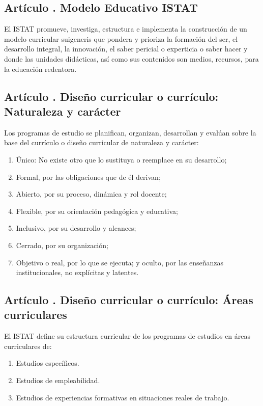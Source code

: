 \subsection{Artículo . Modelo Educativo ISTAT}
\addtocounter{ns}{1}
El ISTAT promueve, investiga, estructura e implementa la construcción de un modelo curricular suigeneris que pondera y prioriza la formación del ser, el desarrollo integral, la innovación, el saber pericial o experticia o saber hacer y donde las unidades didácticas, así como sus contenidos son medios, recursos, para la educación redentora. 
\subsection{Artículo . Diseño curricular o currículo: Naturaleza y carácter}
\addtocounter{ns}{1}
Los programas de estudio se planifican, organizan, desarrollan y evalúan sobre la base del currículo o diseño curricular de naturaleza y carácter:  
\begin{enumerate}
\item Único: No existe otro que lo sustituya o reemplace en su desarrollo;  
\item Formal, por las obligaciones que de él derivan; 
\item Abierto, por su proceso, dinámica y rol docente; 
\item Flexible, por su orientación pedagógica y educativa;  
\item Inclusivo, por su desarrollo y alcances;  
\item Cerrado, por su organización;  
\item Objetivo o real, por lo que se ejecuta; y oculto, por las enseñanzas institucionales, no explícitas y latentes. 
\end{enumerate}
\subsection{Artículo . Diseño curricular o currículo: Áreas curriculares}
\addtocounter{ns}{1}
El ISTAT define su estructura curricular de los programas de estudios en áreas curriculares de: 
\begin{enumerate}
\item Estudios específicos.
\item Estudios de empleabilidad. 
\item Estudios de experiencias formativas en situaciones reales de trabajo. 
\end{enumerate}
